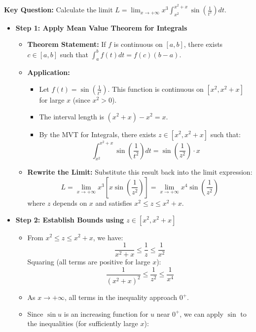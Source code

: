 \begin{cascade}
	\textbf{Key Question:} Calculate the limit $L = \lim_{x \to +\infty} x^3 \int_{x^2}^{x^2+x} \sin\left(\frac{1}{t^2}\right) dt$.
	\begin{itemize}
		\item \textbf{Step 1: Apply Mean Value Theorem for Integrals}
		      \begin{itemize}
			      \item \textbf{Theorem Statement:} If $f$ is continuous on $[a, b]$, there exists $c \in [a, b]$ such that $\int_a^b f(t) dt = f(c)(b-a)$.
			      \item \textbf{Application:}
			            \begin{itemize}
				            \item Let $f(t) = \sin\left(\frac{1}{t^2}\right)$. This function is continuous on $[x^2, x^2+x]$ for large $x$ (since $x^2 > 0$).
				            \item The interval length is $(x^2+x) - x^2 = x$.
				            \item By the MVT for Integrals, there exists $z \in [x^2, x^2+x]$ such that:
				                  \[ \int_{x^2}^{x^2+x} \sin\left(\frac{1}{t^2}\right) dt = \sin\left(\frac{1}{z^2}\right) \cdot x \]
			            \end{itemize}
			      \item \textbf{Rewrite the Limit:} Substitute this result back into the limit expression:
			            \[ L = \lim_{x \to +\infty} x^3 \left[ x \sin\left(\frac{1}{z^2}\right) \right] = \lim_{x \to +\infty} x^4 \sin\left(\frac{1}{z^2}\right) \]
			            where $z$ depends on $x$ and satisfies $x^2 \le z \le x^2+x$.
		      \end{itemize}
		\item \textbf{Step 2: Establish Bounds using $z \in [x^2, x^2+x]$}
		      \begin{itemize}
			      \item From $x^2 \le z \le x^2+x$, we have:
			            \[ \frac{1}{x^2+x} \le \frac{1}{z} \le \frac{1}{x^2} \]
			            Squaring (all terms are positive for large $x$):
			            \[ \frac{1}{(x^2+x)^2} \le \frac{1}{z^2} \le \frac{1}{x^4} \]
			      \item As $x \to +\infty$, all terms in the inequality approach $0^+$.
			      \item Since $\sin u$ is an increasing function for $u$ near $0^+$, we can apply $\sin$ to the inequalities (for sufficiently large $x$):

\end{itemize}
\end{itemize}
\end{cascade}
